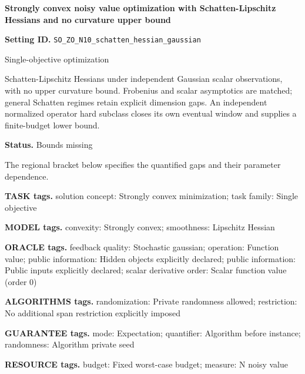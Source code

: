 \documentclass[10pt,a4paper]{article}
\begin{document}
\raggedright

{\LARGE\bfseries\sffamily\color{AtlasNavy} Strongly convex noisy value optimization with Schatten-Lipschitz Hessians and no curvature upper bound\par}\vspace{5pt}


\textbf{Setting ID.} \texttt{SO\_\allowbreak{}ZO\_\allowbreak{}N10\_\allowbreak{}schatten\_\allowbreak{}hessian\_\allowbreak{}gaussian}



Single-objective optimization



Schatten-Lipschitz Hessians under independent Gaussian scalar observations, with no upper curvature bound. Frobenius and scalar asymptotics are matched; general Schatten regimes retain explicit dimension gaps. An independent normalized operator hard subclass closes its own eventual window and supplies a finite-budget lower bound.



\textbf{Status.} Bounds missing



The regional bracket below specifies the quantified gaps and their parameter dependence.



\textbf{TASK tags.} solution concept: Strongly convex minimization; task family: Single objective



\textbf{MODEL tags.} convexity: Strongly convex; smoothness: Lipschitz Hessian



\textbf{ORACLE tags.} feedback quality: Stochastic gaussian; operation: Function value; public information: Hidden objects explicitly declared; public information: Public inputs explicitly declared; scalar derivative order: Scalar function value (order 0)



\textbf{ALGORITHMS tags.} randomization: Private randomness allowed; restriction: No additional span restriction explicitly imposed



\textbf{GUARANTEE tags.} mode: Expectation; quantifier: Algorithm before instance; randomness: Algorithm private seed



\textbf{RESOURCE tags.} budget: Fixed worst-case budget; measure: N noisy value
\end{document}
